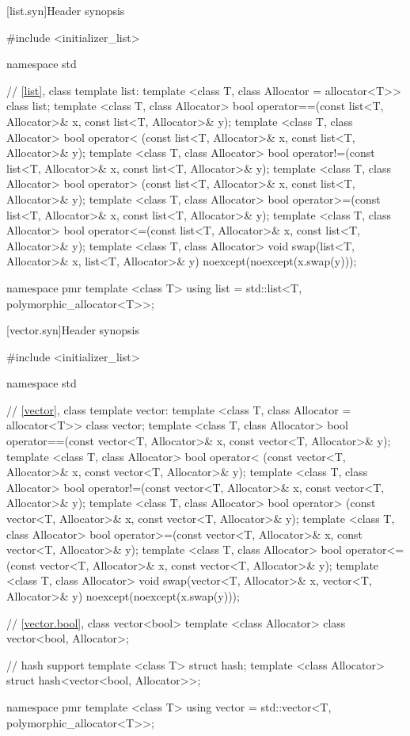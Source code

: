[list.syn]{Header  synopsis}


\begin{codeblock}
#include <initializer_list>

namespace std {
  // \ref{list}, class template list:
  template <class T, class Allocator = allocator<T>> class list;
  template <class T, class Allocator>
    bool operator==(const list<T, Allocator>& x, const list<T, Allocator>& y);
  template <class T, class Allocator>
    bool operator< (const list<T, Allocator>& x, const list<T, Allocator>& y);
  template <class T, class Allocator>
    bool operator!=(const list<T, Allocator>& x, const list<T, Allocator>& y);
  template <class T, class Allocator>
    bool operator> (const list<T, Allocator>& x, const list<T, Allocator>& y);
  template <class T, class Allocator>
    bool operator>=(const list<T, Allocator>& x, const list<T, Allocator>& y);
  template <class T, class Allocator>
    bool operator<=(const list<T, Allocator>& x, const list<T, Allocator>& y);
  template <class T, class Allocator>
    void swap(list<T, Allocator>& x, list<T, Allocator>& y)
      noexcept(noexcept(x.swap(y)));

  namespace pmr {
    template <class T>
      using list = std::list<T, polymorphic_allocator<T>>;
  }
}
\end{codeblock}

[vector.syn]{Header  synopsis}


\begin{codeblock}
#include <initializer_list>

namespace std {
  // \ref{vector}, class template vector:
  template <class T, class Allocator = allocator<T>> class vector;
  template <class T, class Allocator>
    bool operator==(const vector<T, Allocator>& x, const vector<T, Allocator>& y);
  template <class T, class Allocator>
    bool operator< (const vector<T, Allocator>& x, const vector<T, Allocator>& y);
  template <class T, class Allocator>
    bool operator!=(const vector<T, Allocator>& x, const vector<T, Allocator>& y);
  template <class T, class Allocator>
    bool operator> (const vector<T, Allocator>& x, const vector<T, Allocator>& y);
  template <class T, class Allocator>
    bool operator>=(const vector<T, Allocator>& x, const vector<T, Allocator>& y);
  template <class T, class Allocator>
    bool operator<=(const vector<T, Allocator>& x, const vector<T, Allocator>& y);
  template <class T, class Allocator>
    void swap(vector<T, Allocator>& x, vector<T, Allocator>& y)
      noexcept(noexcept(x.swap(y)));

  // \ref{vector.bool}, class vector<bool>
  template <class Allocator> class vector<bool, Allocator>;

  // hash support
  template <class T> struct hash;
  template <class Allocator> struct hash<vector<bool, Allocator>>;

  namespace pmr {
    template <class T>
      using vector = std::vector<T, polymorphic_allocator<T>>;
  }
}
\end{codeblock}

